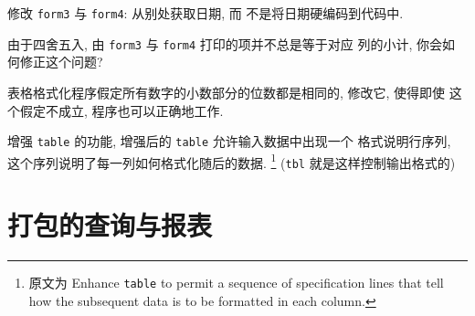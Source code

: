\begin{exercise}
    \label{exer:form3_form4}
    修改 \verb'form3' 与 \verb'form4': 从别处获取日期, 而
    不是将日期硬编码到代码中.
\end{exercise}

\begin{exercise}
    由于四舍五入, 由 \verb'form3' 与 \verb'form4' 打印的项并不总是等于对应
    列的小计, 你会如何修正这个问题?
\end{exercise}

\begin{exercise}
    \label{exer:table_format}
    表格格式化程序假定所有数字的小数部分的位数都是相同的, 修改它, 使得即使 
    这个假定不成立, 程序也可以正确地工作.
\end{exercise}

\begin{exercise}
    增强 \verb'table' 的功能, 增强后的 \verb'table' 允许输入数据中出现一个
    格式说明行序列, 这个序列说明了每一列如何格式化随后的数据.
    \footnote{原文为 
        Enhance \texttt{table} to permit a sequence of specification lines
        that tell how the subsequent data is to be formatted in each column.
    } (\texttt{tbl} 就是这样控制输出格式的)
\end{exercise}

\section{打包的查询与报表}
\label{sec:packaged_queries_and_reports}

